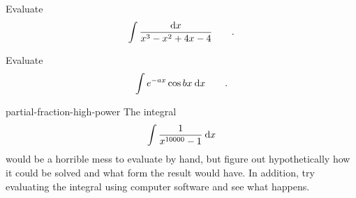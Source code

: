 \begin{hwsection}
\begin{hw}
Evaluate
\begin{equation*}
  \int \frac{\textup{d} x}{x^3-x^2+4x-4} \qquad .
\end{equation*}
\end{hw}

\begin{hw}
Evaluate
\begin{equation*}
  \int e^{-ax}\cos bx \: \textup{d} x \qquad .
\end{equation*}
\end{hw}

\begin{hwwithsoln}{partial-fraction-high-power}
The integral
\begin{equation*}
  \int \frac{1}{x^{10000}-1} \: \textup{d} x
\end{equation*}
would be a horrible mess to evaluate by hand, but figure out hypothetically how
it could be solved and what form the result would have. In addition, try evaluating the integral
using computer software and see what happens.
\end{hwwithsoln}

\end{hwsection}
